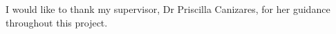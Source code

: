 
\begin{acknowledgements}      


I would like to thank my supervisor, Dr Priscilla Canizares, for her guidance throughout this project.


\end{acknowledgements}

